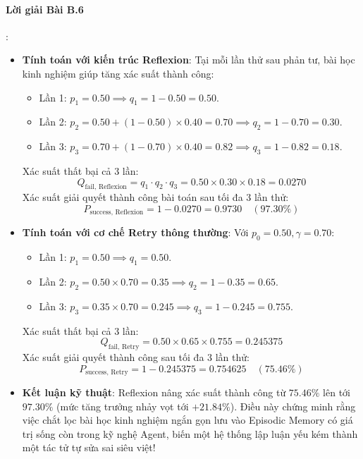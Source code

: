 \paragraph{Lời giải Bài B.6}:
\begin{itemize}
  \item[a)] \textbf{Tính toán với kiến trúc Reflexion}:
  Tại mỗi lần thử sau phản tư, bài học kinh nghiệm giúp tăng xác suất thành công:
  \begin{itemize}
    \item Lần 1: $p_1 = 0.50 \implies q_1 = 1 - 0.50 = 0.50$.
    \item Lần 2: $p_2 = 0.50 + (1 - 0.50) \times 0.40 = 0.70 \implies q_2 = 1 - 0.70 = 0.30$.
    \item Lần 3: $p_3 = 0.70 + (1 - 0.70) \times 0.40 = 0.82 \implies q_3 = 1 - 0.82 = 0.18$.
  \end{itemize}
  Xác suất thất bại cả 3 lần:
  \begin{equation*}
  Q_{\text{fail, Reflexion}} = q_1 \cdot q_2 \cdot q_3 = 0.50 \times 0.30 \times 0.18 = 0.0270
  \end{equation*}
  Xác suất giải quyết thành công bài toán sau tối đa 3 lần thử:
  \begin{equation*}
  P_{\text{success, Reflexion}} = 1 - 0.0270 = \mathbf{0.9730} \quad (\mathbf{97.30\%})
  \end{equation*}

  \item[b)] \textbf{Tính toán với cơ chế Retry thông thường}:
  Với $p_0 = 0.50, \gamma = 0.70$:
  \begin{itemize}
    \item Lần 1: $p_1 = 0.50 \implies q_1 = 0.50$.
    \item Lần 2: $p_2 = 0.50 \times 0.70 = 0.35 \implies q_2 = 1 - 0.35 = 0.65$.
    \item Lần 3: $p_3 = 0.35 \times 0.70 = 0.245 \implies q_3 = 1 - 0.245 = 0.755$.
  \end{itemize}
  Xác suất thất bại cả 3 lần:
  \begin{equation*}
  Q_{\text{fail, Retry}} = 0.50 \times 0.65 \times 0.755 = 0.245375
  \end{equation*}
  Xác suất giải quyết thành công sau tối đa 3 lần thử:
  \begin{equation*}
  P_{\text{success, Retry}} = 1 - 0.245375 = \mathbf{0.754625} \quad (\mathbf{75.46\%})
  \end{equation*}

  \item[c)] \textbf{Kết luận kỹ thuật}:
  Reflexion nâng xác suất thành công từ $75.46\%$ lên tới $97.30\%$ (mức tăng trưởng nhảy vọt tới $\mathbf{+21.84\%}$). Điều này chứng minh rằng việc chắt lọc bài học kinh nghiệm ngắn gọn lưu vào Episodic Memory có giá trị sống còn trong kỹ nghệ Agent, biến một hệ thống lập luận yếu kém thành một tác tử tự sửa sai siêu việt!
\end{itemize}

